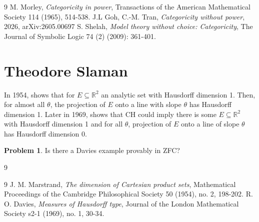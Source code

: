 \documentclass[11pt]{amsart}
\theoremstyle{definition}
\newtheorem{problem}{Problem}[section]
\begin{document}
\vskip -12pt
\begin{bibentry}{}
\begin{thebibliography}{9}
 M. Morley, \textit{Categoricity in power}, Transactions of the American Mathematical Society 114 (1965), 514-538.
 J.L Goh, C.-M. Tran, \textit{Categoricity without power}, 2026, arXiv:2605.00697
 S. Shelah, \textit{Model theory without choice: Categoricity}, The Journal of Symbolic Logic 74 (2) (2009): 361-401.

\end{thebibliography}
\end{bibentry}







\bigskip
\bigskip


\section{Theodore Slaman}
   In 1954, \cite{Mar} shows that for $E\subseteq \mathbb{R}^2$ an analytic set with Hausdorff dimension 1. Then, for almost all $\theta$, the projection of $E$ onto a line with slope $\theta$ has Hausdorff dimension 1. Later in 1969, \cite{Dav} shows that CH could imply there is some $E\subseteq \mathbb{R}^2$ with Hausdorff dimension 1 and for all $\theta$, projection of $E$ onto a line of slope $\theta$ has Hausdorff dimension 0. \par
   \begin{problem}
       Is there a Davies example provably in ZFC?
   \end{problem}
  
  \vskip -10pt
\begin{bibentry}{9}
\begin{thebibliography}{9}
 J. M. Marstrand, \textit{The dimension of Cartesian product sets}, Mathematical Proceedings of the Cambridge Philosophical Society  50 (1954), no. 2, 198-202. 
 R. O. Davies, \textit{Measures of Hausdorff type}, Journal of the London Mathematical Society s2-1 (1969), no. 1, 30-34.
\end{thebibliography}
\end{bibentry}
\end{document}
